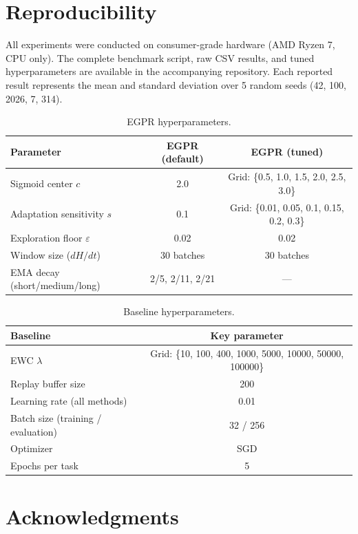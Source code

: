 \documentclass[11pt,a4paper]{article}
\begin{document}
\section{Reproducibility}

All experiments were conducted on consumer-grade hardware (AMD Ryzen 7, CPU only). The complete benchmark script, raw CSV results, and tuned hyperparameters are available in the accompanying repository. Each reported result represents the mean and standard deviation over 5 random seeds (42, 100, 2026, 7, 314).

\begin{table}[htbp]
\centering
\caption{EGPR hyperparameters.}
\begin{tabular}{lcc}
\toprule
Parameter & EGPR (default) & EGPR (tuned) \\
\midrule
Sigmoid center $c$ & 2.0 & Grid: \{0.5, 1.0, 1.5, 2.0, 2.5, 3.0\} \\
Adaptation sensitivity $s$ & 0.1 & Grid: \{0.01, 0.05, 0.1, 0.15, 0.2, 0.3\} \\
Exploration floor $\varepsilon$ & 0.02 & 0.02 \\
Window size ($dH/dt$) & 30 batches & 30 batches \\
EMA decay (short/medium/long) & 2/5, 2/11, 2/21 & --- \\
\bottomrule
\end{tabular}
\end{table}

\begin{table}[htbp]
\centering
\caption{Baseline hyperparameters.}
\begin{tabular}{lc}
\toprule
Baseline & Key parameter \\
\midrule
EWC $\lambda$ & Grid: \{10, 100, 400, 1000, 5000, 10000, 50000, 100000\} \\
Replay buffer size & 200 \\
Learning rate (all methods) & 0.01 \\
Batch size (training / evaluation) & 32 / 256 \\
Optimizer & SGD \\
Epochs per task & 5 \\
\bottomrule
\end{tabular}
\end{table}

\section*{Acknowledgments}
\end{document}
